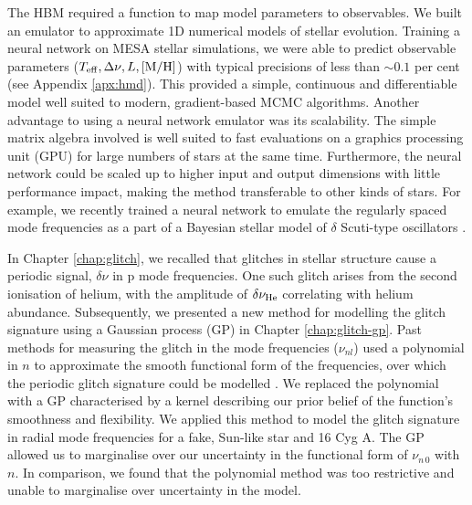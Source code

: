 
The HBM required a function to map model parameters to observables. We built an emulator to approximate 1D numerical models of stellar evolution. Training a neural network on MESA stellar simulations, we were able to predict observable parameters (\({T_\mathrm{eff}}, {\Delta\nu}, L, [\mathrm{M/H}]\)) with typical precisions of less than \(\sim 0.1\) per cent (see Appendix \ref{apx:hmd}). This provided a simple, continuous and differentiable model well suited to modern, gradient-based MCMC algorithms. Another advantage to using a neural network emulator was its scalability. The simple matrix algebra involved is well suited to fast evaluations on a graphics processing unit (GPU) for large numbers of stars at the same time. Furthermore, the neural network could be scaled up to higher input and output dimensions with little performance impact, making the method transferable to other kinds of stars. For example, we recently trained a neural network to emulate the regularly spaced mode frequencies as a part of a Bayesian stellar model of \(\delta\) Scuti-type oscillators \citep{Scutt.Murphy.ea2023}.

In Chapter \ref{chap:glitch}, we recalled that glitches in stellar structure cause a periodic signal, \(\delta\nu\) in p mode frequencies. One such glitch arises from the second ionisation of helium, with the amplitude of \(\delta\nu_{{\mathrm{He}}}\) correlating with helium abundance. Subsequently, we presented a new method for modelling the glitch signature using a Gaussian process (GP) in Chapter \ref{chap:glitch-gp}. Past methods for measuring the glitch in the mode frequencies (\(\nu_{nl}\)) used a polynomial in \(n\) to approximate the smooth functional form of the frequencies, over which the periodic glitch signature could be modelled \citep[e.g.][]{Mazumdar.Monteiro.ea2014,Verma.Raodeo.ea2019}. We replaced the polynomial with a GP characterised by a kernel describing our prior belief of the function's smoothness and flexibility. We applied this method to model the glitch signature in radial mode frequencies for a fake, Sun-like star and 16 Cyg A. The GP allowed us to marginalise over our uncertainty in the functional form of \(\nu_{n\,0}\) with \(n\). In comparison, we found that the polynomial method was too restrictive and unable to marginalise over uncertainty in the model.

